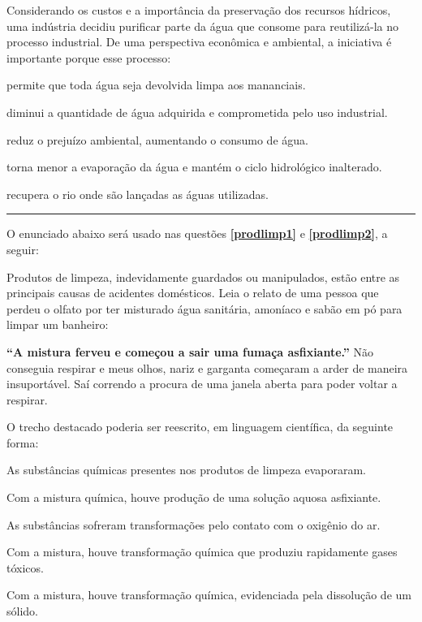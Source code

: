\questao
Considerando os custos e a importância da preservação dos recursos hídricos, uma indústria decidiu purificar parte da água que consome para reutilizá-la no processo industrial. De uma perspectiva econômica e ambiental, a iniciativa é importante porque esse processo:
\begin{alternativas}
\item permite que toda água seja devolvida limpa aos mananciais.
\item diminui a quantidade de água adquirida e comprometida pelo uso industrial.
\item reduz o prejuízo ambiental, aumentando o consumo de água.
\item torna menor a evaporação da água e mantém o ciclo hidrológico inalterado.
\item recupera o rio onde são lançadas as águas utilizadas.
\end{alternativas}

\noindent
\textcolor{qgray}{\leaders\vrule height 8pt depth -0.1pt \hfill \null}
\par
\nopagebreak
\vspace{-8pt}
\noindent\rule[3pt]{\columnwidth}{1pt}

\noindent O enunciado abaixo será usado nas questões \textbf{\ref{prodlimp1}} e \textbf{\ref{prodlimp2}}, a seguir:

Produtos de limpeza, indevidamente guardados ou manipulados, estão entre as principais causas de acidentes domésticos. Leia o relato de uma pessoa que perdeu o olfato por ter misturado água sanitária, amoníaco e sabão em pó para limpar um banheiro:

\textbf{``A mistura ferveu e começou a sair uma fumaça asfixiante.''} Não conseguia respirar e meus olhos, nariz e garganta começaram a arder de maneira insuportável. Saí correndo a procura de uma janela aberta para poder voltar a respirar.

\medskip
\questao\label{prodlimp1}
O trecho destacado poderia ser reescrito, em linguagem científica, da seguinte forma:
\begin{alternativas}
\item As substâncias químicas presentes nos produtos de limpeza evaporaram.
\item Com a mistura química, houve produção de uma solução aquosa asfixiante.
\item As substâncias sofreram transformações pelo contato com o oxigênio do ar.
\item Com a mistura, houve transformação química que produziu rapidamente gases tóxicos.
\item Com a mistura, houve transformação química, evidenciada pela dissolução de um sólido.
\end{alternativas}

